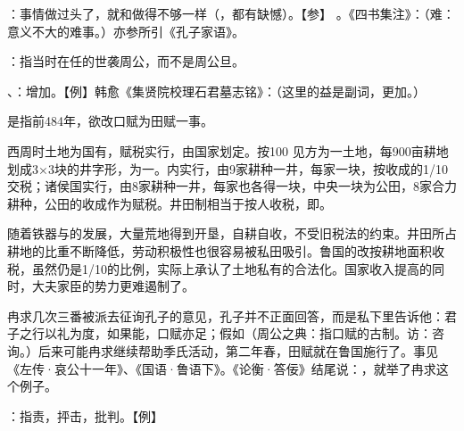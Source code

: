 {
\item {}：事情做过头了，就和做得不够一样（，都有缺憾）。【参】 。《四书集注》：（难：意义不大的难事。）亦参所引《孔子家语》。
}
{}  %


{
\item {}：指当时在任的世袭周公，而不是周公旦。
\item {}、：增加。【例】韩愈《集贤院校理石君墓志铭》：（这里的益是副词，更加。）

是指前484年，欲改口赋为田赋一事。

西周时土地为国有，赋税实行，由国家划定。按100 见方为一土地，每900亩耕地划成3×3块的井字形，为一。内实行，由9家耕种一井，每家一块，按收成的1/10交税；诸侯国实行，由8家耕种一井，每家也各得一块，中央一块为公田，8家合力耕种，公田的收成作为赋税。井田制相当于按人收税，即。

随着铁器与的发展，大量荒地得到开垦，自耕自收，不受旧税法的约束。井田所占耕地的比重不断降低，劳动积极性也很容易被私田吸引。鲁国的改按耕地面积收税，虽然仍是1/10的比例，实际上承认了土地私有的合法化。国家收入提高的同时，大夫家臣的势力更难遏制了。

冉求几次三番被派去征询孔子的意见，孔子并不正面回答，而是私下里告诉他：君子之行以礼为度，如果能，口赋亦足；假如（周公之典：指口赋的古制。访：咨询。）后来可能冉求继续帮助季氏活动，第二年春，田赋就在鲁国施行了。事见《左传·哀公十一年》、《国语·鲁语下》。《论衡·答佞》结尾说：，就举了冉求这个例子。

\item {}：指责，抨击，批判。【例】 
}
{}


